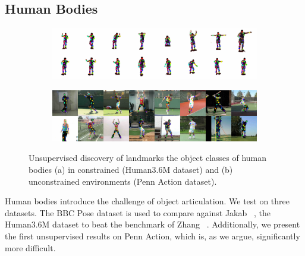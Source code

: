	\subsection{Human Bodies}\label{sec:kp_humanbodies}
		\begin{figure}[htp]
			\centering
			\begin{subfigure}{1.\textwidth}
			\includegraphics[trim={0cm 0cm 0cm 0cm},clip, width=1.\linewidth]{fig/shape/0human}\caption{}
			\end{subfigure}
			\begin{subfigure}{1.\textwidth}
			\includegraphics[trim={0cm 0cm 0cm 0cm},clip, width=1.\linewidth]{fig/shape/0penn}\caption{}
			\end{subfigure}
			\caption{{Unsupervised discovery of landmarks the object classes of human bodies (a) in constrained (Human3.6M dataset) and (b) unconstrained environments (Penn Action dataset).}}
			\label{fig:kp_bodies}
		\end{figure}

		Human bodies introduce the challenge of object articulation. We test on three datasets. The BBC Pose dataset is used to compare against Jakab \etal~\cite{jakab18}, the Human3.6M dataset to beat the benchmark of Zhang \etal~\cite{zhang18}. Additionally, we present the first unsupervised results on Penn Action, which is, as we argue, significantly more difficult.

